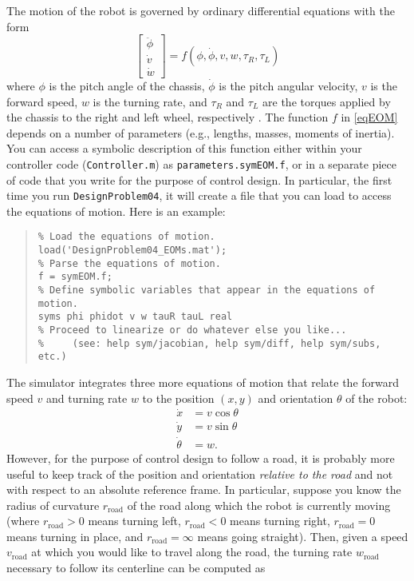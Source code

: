 \documentclass[12pt]{article}
\begin{document}
The motion of the robot is governed by ordinary differential equations with the form
\begin{equation}
\label{eqEOM}
\begin{bmatrix} \ddot{\phi} \\ \dot{v} \\ \dot{w} \end{bmatrix} = f(\phi,\dot{\phi},v,w,\tau_{R},\tau_{L})
\end{equation}
where $\phi$ is the pitch angle of the chassis, $\dot{\phi}$ is the pitch angular velocity, $v$ is the forward speed, $w$ is the turning rate, and $\tau_{R}$ and $\tau_{L}$ are the torques applied by the chassis to the right and left wheel, respectively \cite{Mak2015,Tobias2014}. The function $f$ in \eqref{eqEOM} depends on a number of parameters (e.g., lengths, masses, moments of inertia). You can access a symbolic description of this function either within your controller code (\lstinline|Controller.m|) as \lstinline|parameters.symEOM.f|, or in a separate piece of code that you write for the purpose of control design. In particular, the first time you run \lstinline|DesignProblem04|, it will create a file that you can load to access the equations of motion. Here is an example:
\begin{quote}
\begin{lstlisting}
% Load the equations of motion.
load('DesignProblem04_EOMs.mat');
% Parse the equations of motion.
f = symEOM.f;
% Define symbolic variables that appear in the equations of motion.
syms phi phidot v w tauR tauL real
% Proceed to linearize or do whatever else you like...
%     (see: help sym/jacobian, help sym/diff, help sym/subs, etc.)
\end{lstlisting}
\end{quote}
The simulator integrates three more equations of motion that relate the forward speed $v$ and turning rate $w$ to the position $(x,y)$ and orientation $\theta$ of the robot:
\begin{align*}
\dot{x} &= v\cos\theta \\
\dot{y} &= v\sin\theta \\
\dot{\theta} &= w.
\end{align*}
However, for the purpose of control design to follow a road, it is probably more useful to keep track of the position and orientation {\em relative to the road} and not with respect to an absolute reference frame. In particular, suppose you know the radius of curvature $r_\text{road}$ of the road along which the robot is currently moving (where $r_\text{road}>0$ means turning left, $r_\text{road}<0$ means turning right, $r_\text{road}=0$ means turning in place, and $r_\text{road}=\infty$ means going straight). Then, given a speed $v_\text{road}$ at which you would like to travel along the road, the turning rate $w_\text{road}$ necessary to follow its centerline can be computed as
\end{document}
